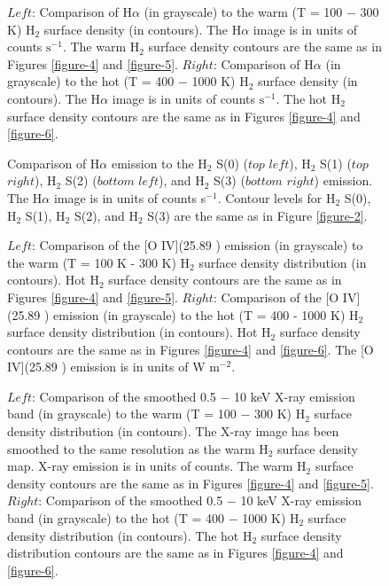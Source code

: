 \documentclass[manuscript]{aastex}
\begin{document}
\clearpage

\begin{figure}
\caption{$Left$: Comparison of  H$\alpha$ (in grayscale) to the warm (T = 100 $-$ 300 K) 
H$_2$ surface density (in contours).  The H$\alpha$ image is in units of counts 
$\mathrm{s^{-1}}$. The warm H$_2$ surface density contours are the same as in 
Figures \ref{figure-4} and \ref{figure-5}.  $Right$: Comparison of H$\alpha$ (in grayscale) 
to the hot (T = 400 $-$ 1000 K) H$_2$ surface density (in contours).  The H$\alpha$ 
image is in units of counts $\mathrm{s^{-1}}$. The hot H$_2$ surface density 
contours are the same as in Figures \ref{figure-4} and \ref{figure-6}.}
\label{figure-10}
\end{figure}

\clearpage

\begin{figure}
\caption{Comparison of H$\alpha$ emission to the H$_2$ S(0) ($top$ $left$),  
H$_2$ S(1) ($top$ $right$),  H$_2$ S(2) ($bottom$ $left$),  and 
H$_2$ S(3) ($bottom$ $right$) emission.  The H$\alpha$ image is in units 
of counts s$^{-1}$.  Contour levels for H$_2$ S(0), H$_2$ S(1), 
H$_2$ S(2), and H$_2$ S(3) are the same as in Figure \ref{figure-2}.}
\label{figure-11}
\end{figure}

\clearpage

\begin{figure}
\caption{$Left$:  Comparison of the [O IV](25.89 \micron) emission (in grayscale) to 
the warm (T = 100 K - 300 K) H$_2$ surface density distribution (in contours).  
Hot H$_2$ surface density contours are the same as in Figures \ref{figure-4} and \ref{figure-5}.  
$Right$: Comparison of the [O IV](25.89 \micron) emission (in grayscale) to the hot 
(T = 400 - 1000 K) H$_2$ surface density distribution (in contours).  Hot H$_2$ 
surface density contours are the same as in Figures \ref{figure-4} and \ref{figure-6}.  The [O IV](25.89 \micron)
 emission is in units of W $\mathrm{m^{-2}}$.}
\label{figure-12}
\end{figure}

\clearpage

\begin{figure}
\caption{$Left$:  Comparison of the smoothed 0.5 $-$ 10 keV X-ray emission band 
(in grayscale) to the warm (T = 100 $-$ 300 K) H$_2$ surface density distribution 
(in contours).   The X-ray image has been smoothed to the same resolution as the 
warm H$_2$ surface density map.  X-ray emission is in units of counts.  The warm H$_2$ 
surface density contours are the same as in Figures \ref{figure-4} and \ref{figure-5}.  $Right$: 
Comparison of the smoothed 0.5 $-$ 10 keV X-ray emission band (in grayscale) to the hot 
(T = 400 $-$ 1000 K) H$_2$ surface density distribution (in contours).  The hot
H$_2$ surface density distribution contours are the same as in Figures \ref{figure-4} 
and \ref{figure-6}.}
\label{figure-13}
\end{figure}
\end{document}
